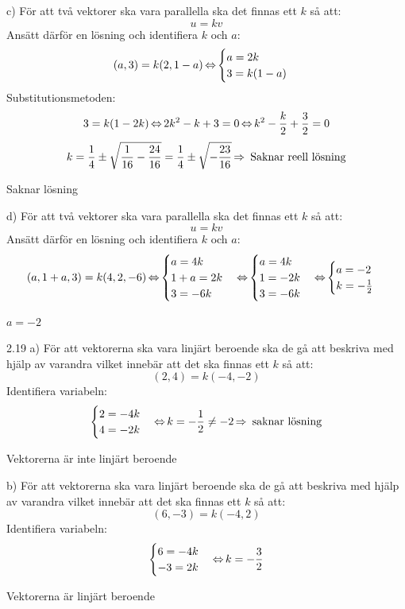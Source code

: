 \begin{task}{c)}
	För att två vektorer ska vara parallella ska det finnas ett $k$ så att:
	\[u=kv\]
	Ansätt därför en lösning och identifiera $k$ och $a$:
	\[(a,3)=k(2,1-a) \operatorname{\Leftrightarrow}
	\begin{cases}
		a=2k \\
		3=k(1-a)
	\end{cases}\]
	Substitutionsmetoden:
	\[3=k(1-2k) \operatorname{\Leftrightarrow}
	2k^2-k+3=0 \operatorname{\Leftrightarrow}
	k^2-\frac{k}{2}+\frac{3}{2}=0\]
	\[k=\frac{1}{4}\pm\sqrt{\frac{1}{16}-\frac{24}{16}}=\frac{1}{4}\pm\sqrt{-\frac{23}{16}} \operatorname{\Rightarrow} \text{ Saknar reell lösning}\]

	\ans Saknar lösning
\end{task}

\begin{task}{d)}
	För att två vektorer ska vara parallella ska det finnas ett $k$ så att:
	\[u=kv\]
	Ansätt därför en lösning och identifiera $k$ och $a$:
	\[(a,1+a,3)=k(4,2,-6) \operatorname{\Leftrightarrow}
	\begin{cases}
		a=4k \\
		1+a=2k \\
		3=-6k
	\end{cases} \operatorname{\Leftrightarrow}
	\begin{cases}
		a=4k \\
		1=-2k \\
		3=-6k
	\end{cases} \operatorname{\Leftrightarrow}
	\begin{cases}
		a=-2 \\
		k=-\frac{1}{2}
	\end{cases}\]
	
	\ans $a=-2$
\end{task}

\begin{task}{2.19 a)}
	För att vektorerna ska vara linjärt beroende ska de gå att beskriva med hjälp av varandra vilket innebär att det ska finnas ett $k$ så att:
	\[(2,4)=k(-4,-2)\]
	Identifiera variabeln:
	\[\begin{cases}
		2=-4k \\
		4=-2k
	\end{cases} \operatorname{\Leftrightarrow}
	k=-\frac{1}{2}\neq-2 \operatorname{\Rightarrow} \text{ saknar lösning}\]
	
	\ans Vektorerna är inte linjärt beroende
\end{task}

\begin{task}{b)}
	För att vektorerna ska vara linjärt beroende ska de gå att beskriva med hjälp av varandra vilket innebär att det ska finnas ett $k$ så att:
	\[(6,-3)=k(-4,2)\]
	Identifiera variabeln:
	\[\begin{cases}
		6=-4k \\
		-3=2k
	\end{cases} \operatorname{\Leftrightarrow}
	k=-\frac{3}{2}\]
	
	\ans Vektorerna är linjärt beroende
\end{task}

